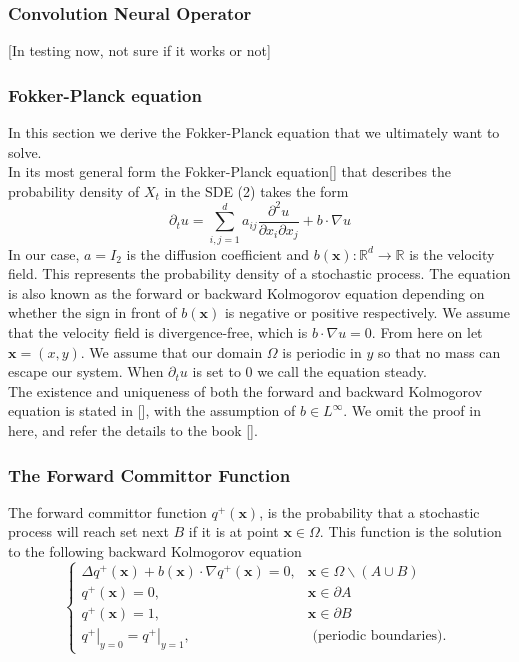 \documentclass{article}
\begin{document}
\subsubsection {Convolution Neural Operator}
[In testing now, not sure if it works or not]

\subsubsection{Fokker-Planck equation}

In this section we derive the Fokker-Planck equation that we ultimately want to solve. \\ 

In its most general form the Fokker-Planck equation[] that describes the probability density of $X_{t}$ in the SDE (2) takes the form
$$
\partial_{t} u=\sum_{i, j=1}^{d} a_{i j} \frac{\partial^{2} u}{\partial x_{i} \partial x_{j}}+b \cdot \nabla u
$$
In our case, $a=I_{2}$ is the diffusion coefficient and $b(\boldsymbol{x}): \mathbb{R}^{d} \rightarrow \mathbb{R}$ is the velocity field. This represents the probability density of a stochastic process. The equation is also known as the forward or backward Kolmogorov equation depending on whether the sign in front of $b(\boldsymbol{x})$ is negative or positive respectively. We assume that the velocity field is divergence-free, which is $b \cdot \nabla u=0$. From here on let $\boldsymbol{x}=(x, y)$. We assume that our domain $\Omega$ is periodic in $y$ so that no mass can escape our system. When $\partial_{t} u$ is set to 0 we call the equation steady. \\

The existence and uniqueness of both the forward and backward Kolmogorov equation is stated in [], with the assumption of $b \in L^\infty$. We omit the proof in here, and refer the details to the book [].

\subsubsection{The Forward Committor Function}

The forward committor function $q^{+}(\boldsymbol{x})$, is the probability that a stochastic process will reach set next $B$ if it is at point $\boldsymbol{x} \in \Omega$. This function is the solution to the following backward Kolmogorov equation
$$
\begin{cases}\Delta q^{+}(\boldsymbol{x})+b(\boldsymbol{x}) \cdot \nabla q^{+}(\boldsymbol{x})=0, & \boldsymbol{x} \in \Omega \backslash(A \cup B) \\ q^{+}(\boldsymbol{x})=0, & \boldsymbol{x} \in \partial A \\ q^{+}(\boldsymbol{x})=1, & \boldsymbol{x} \in \partial B \\ \left.q^{+}\right|_{y=0}=\left.q^{+}\right|_{y=1}, & \text { (periodic boundaries). }\end{cases}
$$
\end{document}
